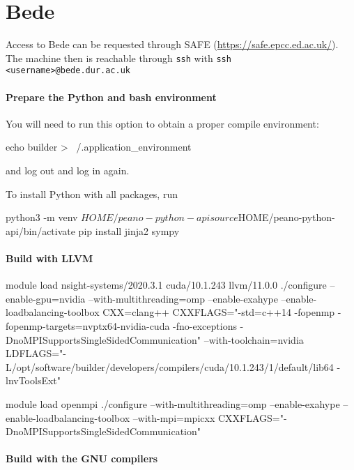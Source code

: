 


\section{Bede}


Access to Bede can be requested through SAFE
(\url{https://safe.epcc.ed.ac.uk/}).
The machine then is reachable through \texttt{ssh} with \texttt{ssh
<username>@bede.dur.ac.uk}


\paragraph{Prepare the Python and bash environment}

You will need to run this option to obtain a proper compile environment:
\begin{code}
echo builder > ~/.application_environment
\end{code}
and log out and log in again.


To install Python with all packages, run
\begin{code}
python3 -m venv $HOME/peano-python-api
source $HOME/peano-python-api/bin/activate
pip install jinja2 sympy
\end{code}



\paragraph{Build with LLVM}


\begin{code}
module load nsight-systems/2020.3.1 cuda/10.1.243 llvm/11.0.0
./configure --enable-gpu=nvidia --with-multithreading=omp --enable-exahype --enable-loadbalancing-toolbox CXX=clang++ CXXFLAGS="-std=c++14 -fopenmp -fopenmp-targets=nvptx64-nvidia-cuda -fno-exceptions -DnoMPISupportsSingleSidedCommunication" --with-toolchain=nvidia LDFLAGS="-L/opt/software/builder/developers/compilers/cuda/10.1.243/1/default/lib64 -lnvToolsExt"


module load openmpi
./configure --with-multithreading=omp --enable-exahype --enable-loadbalancing-toolbox --with-mpi=mpicxx CXXFLAGS="-DnoMPISupportsSingleSidedCommunication"
\end{code}


\paragraph{Build with the GNU compilers}



